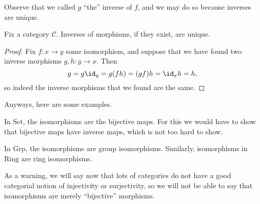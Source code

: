 Observe that we called $g$ ``the'' inverse of $f$, and we may do so because inverses are unique.
\begin{proposition}
	Fix a category $\mathcal C$. Inverses of morphisms, if they exist, are unique.
\end{proposition}
\begin{proof}
	Fix $f:x\to y$ some isomorphism, and suppose that we have found two inverse morphisms $g,h:y\to x$. Then
	\[g=g\id_y=g(fh)=(gf)h=\id_xh=h,\]
	so indeed the inverse morphisms that we found are the same.
\end{proof}
Anyways, here are some examples.
\begin{example}
	In $\mathrm{Set}$, the isomorphisms are the bijective maps. For this we would have to show that bijective maps have inverse maps, which is not too hard to show.
\end{example}
\begin{example}
	In $\mathrm{Grp}$, the isomorphisms are group isomorphisms. Similarly, isomorphisms in $\mathrm{Ring}$ are ring isomorphisms.
\end{example}
As a warning, we will say now that lots of categories do not have a good categorial notion of injectivity or surjectivity, so we will not be able to say that isomorphisms are merely ``bijective'' morphisms.